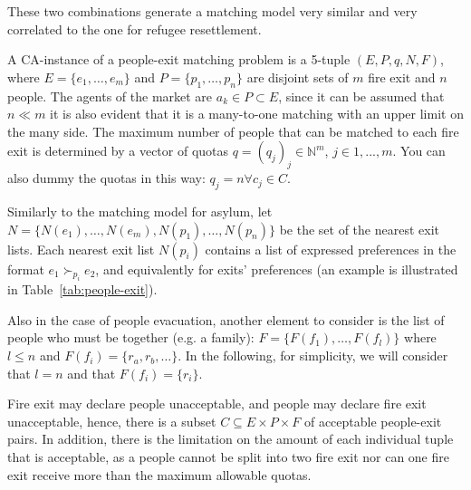 \documentclass[letterpaper]{article} %
\begin{document}
    These two combinations generate a matching model very similar and very correlated to the one for refugee resettlement.

    A CA-instance of a people-exit matching problem is a 5-tuple $(E, P, q, N, F)$, where $E = \{e_1, \dots, e_m\}$ and $P = \{p_1, \dots, p_n\}$ are disjoint sets of $m$ fire exit and $n$ people.
    The agents of the market are $a_k \in P \subset E$, since it can be assumed that $n \ll m$ it is also evident that it is a many-to-one matching with an upper limit on the many side.
    The maximum number of people that can be matched to each fire exit is determined by a vector of quotas $q = (q_j)_j \in \mathbb{N}^m$, $j\in {1,...,m}$.
    You can also dummy the quotas in this way:  $q_j = n \forall c_j \in C$.

    Similarly to the matching model for asylum, let $N = \{N(e_1), \dots, N(e_m), N(p_1), \dots, N(p_n)\}$ be the set of the nearest exit lists.
    Each nearest exit list $N(p_i)$ contains a list of expressed preferences in the format $e_1 \succ_{p_i} e_2$, and equivalently for exits' preferences (an example is illustrated in Table~\ref{tab:people-exit}).

    Also in the case of people evacuation, another element to consider is the list of people who must be together (e.g. a family): $F=\{F(f_1), \dots, F(f_l)\}$ where $l\leq n$ and $F(f_i) = \{r_a, r_b, \dots\}$.
    In the following, for simplicity, we will consider that $l=n$ and that $F(f_i)=\{r_i\}$.
    

    Fire exit may declare people unacceptable, and people may declare fire exit unacceptable,
    hence, there is a subset \(C \subseteq E \times P \times F\) of acceptable people-exit pairs.
    In addition, there is the limitation on the amount of each individual tuple that is acceptable, as a people
    cannot be split into two fire exit nor can one fire exit receive more than the maximum allowable quotas.
\end{document}
